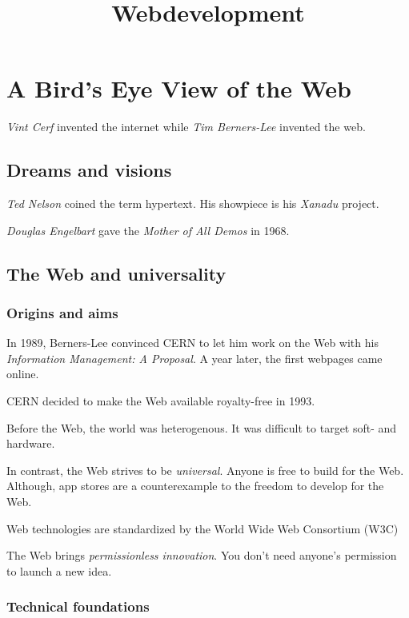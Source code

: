 \documentclass{report}
\title{Webdevelopment}
\date{}
\author{}
\begin{document}
\maketitle

\chapter{A Bird's Eye View of the Web}

\emph{Vint Cerf} invented the internet
while \emph{Tim Berners-Lee} invented the web.

\section{Dreams and visions}

\emph{Ted Nelson} coined the term hypertext.
His showpiece is his \emph{Xanadu} project.

\emph{Douglas Engelbart} gave
the \emph{Mother of All Demos} in 1968.

\section{The Web and universality}

\subsection{Origins and aims}

In 1989, Berners-Lee convinced CERN to let him work
on the Web with his \emph{Information Management: A Proposal}.
A year later, the first webpages came online.

CERN decided to make the Web available royalty-free in 1993.

Before the Web, the world was heterogenous.
It was difficult to target soft- and hardware.

In contrast, the Web strives to be \emph{universal}.
Anyone is free to build for the Web.
Although, app stores are a counterexample
to the freedom to develop for the Web.

Web technologies are standardized
by the World Wide Web Consortium (W3C)

The Web brings \emph{permissionless innovation}.
You don't need anyone's permission to launch a new idea.

\subsection{Technical foundations}
\end{document}

